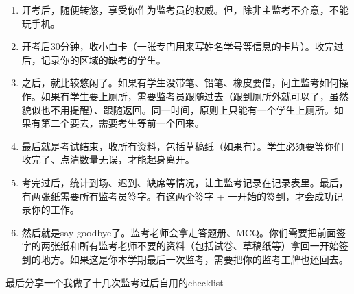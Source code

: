 \begin{enumerate}
    \item 开考后，随便转悠，享受你作为监考员的权威。但，除非主监考不介意，不能玩手机。
    \item 开考后30分钟，收小白卡（一张专门用来写姓名学号等信息的卡片）。收完过后，记录你的区域的缺考的学生。
    \item 之后，就比较悠闲了。如果有学生没带笔、铅笔、橡皮要借，问主监考如何操作。如果有学生要上厕所，需要监考员跟随过去（跟到厕所外就可以了，虽然貌似也不用提醒）、跟随返回。同一时间，原则上只能有一个学生上厕所。如果有第二个要去，需要考生等前一个回来。
    \item 最后就是考试结束，收所有资料，包括草稿纸（如果有）。学生必须要等你们收完了、点清数量无误，才能起身离开。
    \item 考完过后，统计到场、迟到、缺席等情况，让主监考记录在记录表里。最后，有两张纸需要所有监考员签字。有这两个签字 + 一开始的签到，才会成功记录你的工作。
    \item 然后就是say goodbye了。监考老师会拿走答题册、MCQ。你们需要把前面签字的两张纸和所有监考老师不要的资料（包括试卷、草稿纸等）拿回一开始签到的地方。如果这是你本学期最后一次监考，需要把你的监考工牌也还回去。
\end{enumerate}

\emptyline{}
最后分享一个我做了十几次监考过后自用的checklist

